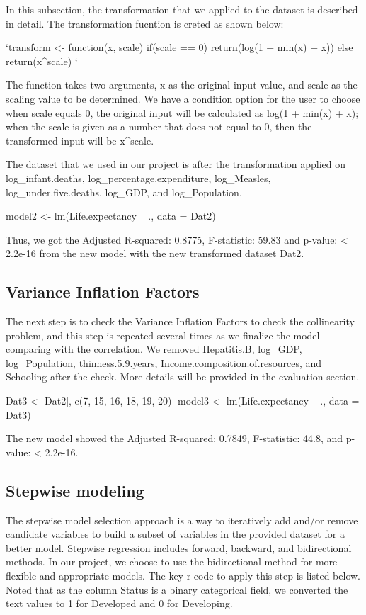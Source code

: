 In this subsection, the transformation that we applied to the dataset is described in detail. The transformation fucntion is creted as shown below:

`transform <- function(x, scale) {
  if(scale == 0) return(log(1 + min(x) + x))
  else return(x^scale)
}`

The function takes two arguments, x as the original input value, and scale as the scaling value to be determined. We have a condition option for the user to choose when scale equals 0, the original input will be calculated as log(1 + min(x) + x); when the scale is given as a number that does not equal to 0, then the transformed input will be x^scale.

The dataset that we used in our project is after the transformation applied on log_infant.deaths, log_percentage.expenditure, log_Measles, log_under.five.deaths, log_GDP, and log_Population.

model2 <- lm(Life.expectancy ~ ., data = Dat2)

Thus, we got the Adjusted R-squared: 0.8775, F-statistic: 59.83 and p-value: < 2.2e-16 from the new model with the new transformed dataset Dat2.

\subsection{Variance Inflation Factors}

The next step is to check the Variance Inflation Factors to check the collinearity problem, and this step is repeated several times as we finalize the model comparing with the correlation. We removed Hepatitis.B, log_GDP, log_Population, thinness.5.9.years, Income.composition.of.resources, and Schooling after the check. More details will be provided in the evaluation section.

Dat3 <- Dat2[,-c(7, 15, 16, 18, 19, 20)]
model3 <- lm(Life.expectancy ~ ., data = Dat3)

The new model showed the Adjusted R-squared: 0.7849, F-statistic:  44.8, and p-value: < 2.2e-16.


\subsection{Stepwise modeling}

The stepwise model selection approach is a way to iteratively add and/or remove candidate variables to build a subset of variables in the provided dataset for a better model. Stepwise regression includes forward, backward, and bidirectional methods. In our project, we choose to use the bidirectional method for more flexible and appropriate models. The key r code to apply this step is listed below. Noted that as the column Status is a binary categorical field, we converted the text values to 1 for Developed and 0 for Developing.

